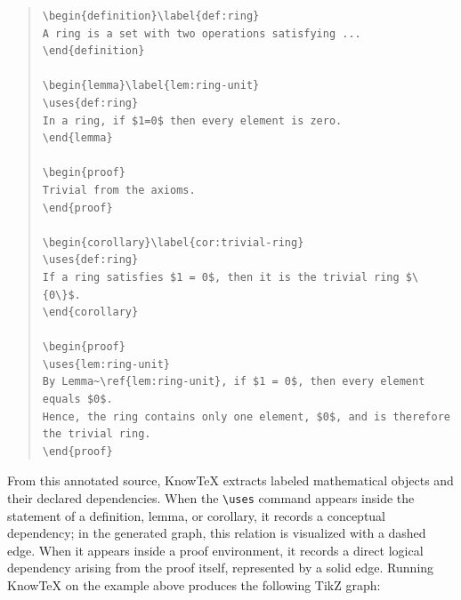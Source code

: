 \documentclass{article}
\begin{document}
\begin{quote}
\begin{verbatim}
\begin{definition}\label{def:ring}
A ring is a set with two operations satisfying ...
\end{definition}

\begin{lemma}\label{lem:ring-unit}
\uses{def:ring}
In a ring, if $1=0$ then every element is zero.
\end{lemma}

\begin{proof}
Trivial from the axioms.
\end{proof}

\begin{corollary}\label{cor:trivial-ring}
\uses{def:ring}
If a ring satisfies $1 = 0$, then it is the trivial ring $\{0\}$.
\end{corollary}

\begin{proof}
\uses{lem:ring-unit}
By Lemma~\ref{lem:ring-unit}, if $1 = 0$, then every element equals $0$.  
Hence, the ring contains only one element, $0$, and is therefore the trivial ring.
\end{proof}
\end{verbatim}
\end{quote}

From this annotated source, KnowTeX extracts labeled mathematical objects and their declared dependencies. When the \verb|\uses| command appears inside the statement of a definition, lemma, or corollary, it records a conceptual dependency; in the generated graph, this relation is visualized with a dashed edge. When it appears inside a proof environment, it records a direct logical dependency arising from the proof itself, represented by a solid edge. Running KnowTeX on the example above produces the following TikZ graph:

\begin{center}
\end{center}
\end{document}
